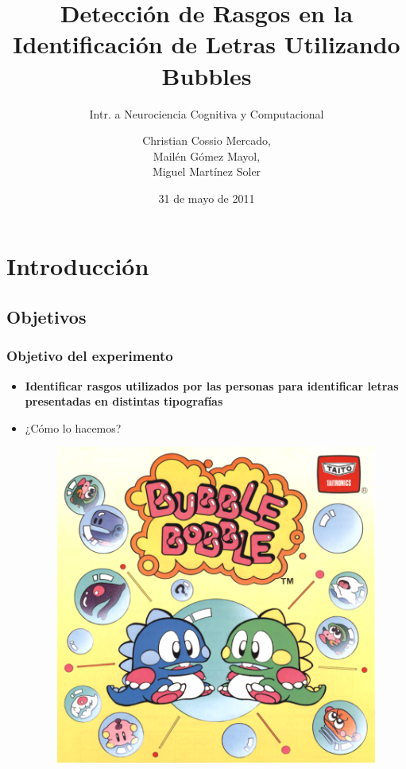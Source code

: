 \documentclass[10pt]{beamer}
\title[Identificaci\'on de Letras Utilizando Bubbles]{Detecci\'on de Rasgos en la Identificaci\'on de Letras Utilizando Bubbles}
\subtitle{Intr. a Neurociencia Cognitiva y Computacional}
\author[Miguel, Mail\'en, Christian]{Christian Cossio Mercado,\\Mail\'en G\'omez Mayol,\\Miguel Mart\'inez Soler}
\institute[FCEyN,UBA]{Departamento de Computaci\'on - FCEyN, UBA}
\date{31 de mayo de 2011}
\begin{document}
\begin{frame}%
\titlepage
\end{frame}

\section{Introducci\'on}
  \subsection{Objetivos}
      \begin{frame}
	\frametitle{Objetivo del experimento}
	\begin{itemize}
		\item \textbf{Identificar rasgos utilizados por las personas para identificar letras presentadas en distintas tipograf\'ias}\pause
		\item \alert{¿Cómo lo hacemos?}
		  \begin{figure}
			  \includegraphics[height=0.7\textheight]{graficos/bubblebobble.png}
		  \end{figure}
	\end{itemize}
      \end{frame}
\end{document}
